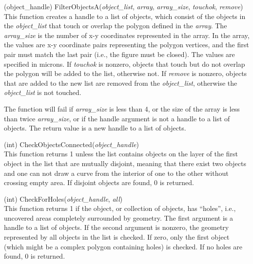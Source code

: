 \begin{description}
\item{(object\_handle) \vt FilterObjectsA({\it object\_list},
{\it array}, {\it array\_size}, {\it touchok}, {\it remove\/})}\\
This function creates a handle to a list of objects, which consist of
the objects in the {\it object\_list} that touch or overlap the
polygon defined in the {\it array}.  The {\it array\_size} is the
number of x-y coordinates represented in the array.  In the array, the
values are x-y coordinate pairs representing the polygon vertices, and
the first pair must match the last pair (i.e., the figure must be
closed).  The values are specified in microns.  If {\it touchok} is
nonzero, objects that touch but do not overlap the polygon will be
added to the list, otherwise not.  If {\it remove} is nonzero, objects
that are added to the new list are removed from the {\it
object\_list}, otherwise the {\it object\_list} is not touched.

The function will fail if {\it array\_size} is less than 4, or the
size of the array is less than twice {\it array\_size}, or if the
handle argument is not a handle to a list of objects.  The return
value is a new handle to a list of objects.

\item{(int) \vt CheckObjectsConnected({\it object\_handle\/})}\\
This function returns 1 unless the list contains objects on the layer
of the first object in the list that are mutually disjoint, meaning
that there exist two objects and one can not draw a curve from the
interior of one to the other without crossing empty area.  If disjoint
objects are found, 0 is returned.

\item{(int) \vt CheckForHoles({\it object\_handle\/}, {\it all\/})}\\
This function returns 1 if the object, or collection of objects, has
``holes'', i.e., uncovered areas completely surrounded by geometry. 
The first argument is a handle to a list of objects.  If the second
argument is nonzero, the geometry represented by all objects in the
list is checked.  If zero, only the first object (which might be a
complex polygon containing holes) is checked.  If no holes are found,
0 is returned.


\end{description}
